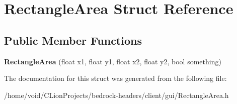 \hypertarget{struct_rectangle_area}{}\section{Rectangle\+Area Struct Reference}
\label{struct_rectangle_area}
\subsection*{Public Member Functions}
\begin{DoxyCompactItemize}
\item 
\mbox{\label{struct_rectangle_area_a97f5f762e8f9224a91155c1250ca4ff4}} 
{\bfseries Rectangle\+Area} (float x1, float y1, float x2, float y2, bool something)
\end{DoxyCompactItemize}


The documentation for this struct was generated from the following file\+:\begin{DoxyCompactItemize}
\item 
/home/void/\+C\+Lion\+Projects/bedrock-\/headers/client/gui/Rectangle\+Area.\+h\end{DoxyCompactItemize}
